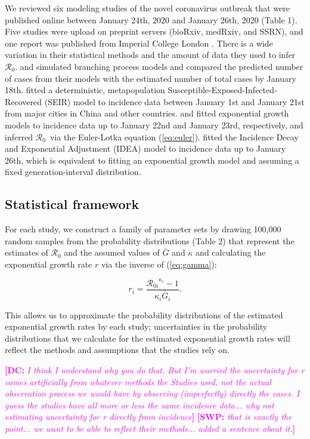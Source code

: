 \documentclass[12pt]{article}
\newcommand{\eref}[1]{(\ref{eq:#1})}
\newcommand{\Rx}[1]{\ensuremath{{\mathcal R}_{#1}}}
\newcommand{\Ro}{\Rx{0}\xspace}
\newcommand{\comment}[3]{\textcolor{#1}{\textbf{[#2: }\textsl{#3}\textbf{]}}}
\newcommand{\swp}[1]{\comment{magenta}{SWP}{#1}}
\newcommand{\dc}[1]{\comment{magenta}{DC}{#1}}
\begin{document}
We reviewed six modeling studies of the novel coronavirus outbreak that were published online between January 24th, 2020 and January 26th, 2020 (Table 1).
Five studies \citep{liuncov, majumderncov, readncov, riouncov, zhaoncov} were upload on preprint servers (bioRxiv, medRxiv, and SSRN), and one report was published from Imperial College London \citep{imaincov}.
There is a wide variation in their statistical methods and the amount of data they used to infer \Ro.
\cite{imaincov} and \cite{riouncov} simulated branching process models and compared the predicted number of cases from their models with the estimated number of total cases by January 18th.
\cite{readncov} fitted a deterministic, metapopulation Susceptible-Exposed-Infected-Recovered (SEIR) model to incidence data between January 1st and January 21st from major cities in China and other countries.
\cite{zhaoncov} and \cite{liuncov} fitted exponential growth models to incidence data up to January 22nd and January 23rd, respectively, and inferred \Ro\ via the Euler-Lotka equation \eref{euler}.
\cite{majumderncov} fitted the Incidence Decay and Exponential Adjustment (IDEA) model \citep{fisman2013idea} to incidence data up to January 26th, which is equivalent to fitting an exponential growth model and assuming a fixed generation-interval distribution.

\subsection{Statistical framework}

For each study, we construct a family of parameter sets by drawing 100,000 random samples from the probability distributions (Table 2) that represent the estimates of \Ro and the assumed values of $\bar G$ and $\kappa$ and calculating the exponential growth rate $r$ via the inverse of \eref{gamma}:
\begin{linenomath*}
\begin{equation}
r_i = \frac{{\mathcal R_{0i}}^{\kappa_i} - 1}{\kappa_i \bar{G}_i}.
\end{equation}
\end{linenomath*}
This allows us to approximate the probability distributions of the estimated exponential growth rates by each study;
uncertainties in the probability distributions that we calculate for the estimated exponential growth rates will reflect the methods and assumptions that the studies rely on.

\dc{I think I understand why you do that. But I’m worried the uncertainty for r comes
artificially from whatever methods the Studies used, not the actual observation process we
would have by observing (imperfectly) directly the cases. I guess the studies have all more or
less the same incidence data... why not estimating uncertainty for r directly from incidence}
\swp{that is exactly the point... we want to be able to reflect their methods... added a sentence about it.}
\end{document}

